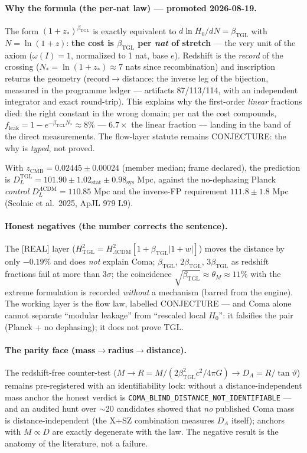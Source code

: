 \documentclass[11pt]{article}
\newcommand{\bTGL}{\beta_{\mathrm{TGL}}}\newcommand{\Msun}{M_{\odot}}\newcommand{\TGL}{\mathrm{TGL}}
\theoremstyle{definition}\newtheorem{deriv}{Derivation}
\begin{document}
\paragraph{Why the formula (the per-nat law) --- promoted 2026-08-19.} The form $(1+z_*)^{\bTGL}$ is exactly equivalent to $d\ln H_0/dN=\bTGL$ with $N=\ln(1+z)$: \textbf{the cost is $\bTGL$ per \emph{nat} of stretch} --- the very unit of the axiom ($\omega(I)=1$, normalized to 1 nat, base $e$). Redshift is the \emph{record} of the crossing ($N_*=\ln(1+z_*)\approx 7$ nats since recombination) and inscription returns the geometry (record$\to$distance: the inverse leg of the bijection, measured in the programme ledger --- artifacts 87/113/114, with an independent integrator and exact round-trip). This explains why the first-order \emph{linear} fractions died: the right constant in the wrong domain; per nat the cost compounds, $f_{\mathrm{leak}}=1-e^{-\bTGL N_*}\approx 8\%$ --- $6.7\times$ the linear fraction --- landing in the band of the direct measurements. The flow-layer statute remains \textsf{CONJECTURE}: the why is \emph{typed}, not proved.

With $z_{\mathrm{CMB}}=0.02445\pm0.00024$ (member median; frame declared), the prediction is $D_L^{\mathrm{TGL}}=101.90\pm1.02_{\mathrm{stat}}\pm0.98_{\mathrm{sys}}$ Mpc, against the no-dephasing Planck \emph{control} $D_L^{\Lambda\mathrm{CDM}}=110.85$ Mpc and the inverse-FP requirement $111.8\pm1.8$ Mpc (Scolnic et al.\ 2025, ApJL 979 L9).

\paragraph{Honest negatives (the number corrects the sentence).} The [REAL] layer ($H^2_{\mathrm{TGL}}=H^2_{\Lambda\mathrm{CDM}}[1+\bTGL|1+w|]$) moves the distance by only $-0.19\%$ and does \emph{not} explain Coma; $\bTGL$, $2\bTGL$, $3\bTGL$ as redshift fractions fail at more than $3\sigma$; the coincidence $\sqrt{\bTGL}\approx\theta_M\approx11\%$ with the extreme formulation is recorded \emph{without} a mechanism (barred from the engine). The working layer is the flow law, labelled \textsf{CONJECTURE} --- and Coma alone cannot separate ``modular leakage'' from ``rescaled local $H_0$'': it falsifies the pair (Planck + no dephasing); it does not prove TGL.

\paragraph{The parity face (mass$\to$radius$\to$distance).} The redshift-free counter-test ($M\to R=M/(2\bTGL^2 c^2/4\pi G)\to D_A=R/\tan\vartheta$) remains pre-registered with an identifiability lock: without a distance-independent mass anchor the honest verdict is \texttt{COMA\_BLIND\_DISTANCE\_NOT\_IDENTIFIABLE} --- and an audited hunt over $\sim$20 candidates showed that \emph{no} published Coma mass is distance-independent (the X+SZ combination measures $D_A$ itself); anchors with $M\propto D$ are exactly degenerate with the law. The negative result is the anatomy of the literature, not a failure.
\end{document}

